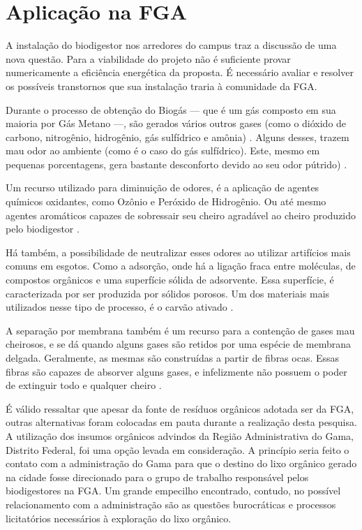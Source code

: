 \section {Aplicação na FGA}
A instalação do biodigestor nos arredores do campus traz a discussão de uma nova questão. Para a viabilidade do projeto não é suficiente provar numericamente a eficiência energética da proposta. É necessário avaliar e resolver os possíveis transtornos que sua instalação traria à comunidade da FGA.
\par Durante o processo de obtenção do Biogás — que é um gás composto em sua maioria por Gás Metano —, são gerados vários outros gases (como o dióxido de carbono, nitrogênio, hidrogênio, gás sulfídrico e amônia) \cite{treinamentobiodigestao}. Alguns desses, trazem mau odor ao ambiente (como é o caso do gás sulfídrico). Este, mesmo em pequenas porcentagens, gera bastante desconforto devido ao seu odor pútrido) \cite{viabilidadefinanceirabiogas}.
\par Um recurso utilizado para diminuição de odores, é a aplicação de agentes químicos oxidantes, como Ozônio e Peróxido de Hidrogênio. Ou até mesmo agentes aromáticos capazes de sobressair seu cheiro agradável ao cheiro produzido pelo biodigestor \cite{reduceammoniaandodor} \cite{viabilidadefinanceirabiogas}.
\par Há também, a possibilidade de neutralizar esses odores ao utilizar artifícios mais comuns em esgotos. Como a adsorção, onde há a ligação fraca entre moléculas, de compostos orgânicos e uma superfície sólida de adsorvente. Essa superfície, é caracterizada por ser produzida por sólidos porosos. Um dos materiais mais utilizados nesse tipo de processo, é o carvão ativado \cite{alternativasemissoes}.
\par A separação por membrana também é um recurso para a contenção de gases mau cheirosos, e se dá quando alguns gases são retidos por uma espécie de membrana delgada. Geralmente, as mesmas são construídas a partir de fibras ocas. Essas fibras são capazes de absorver alguns gases, e infelizmente não possuem o poder de extinguir todo e qualquer cheiro \cite{alternativasemissoes}.
\par É válido ressaltar que apesar da fonte de resíduos orgânicos adotada ser da FGA, outras alternativas foram colocadas em pauta durante a realização desta pesquisa. A utilização dos insumos orgânicos advindos da Região Administrativa do Gama, Distrito Federal, foi uma opção levada em consideração. A princípio seria feito o contato com a administração do Gama para que o destino do lixo orgânico gerado na cidade fosse direcionado para o grupo de trabalho responsável pelos biodigestores na FGA. Um grande empecilho encontrado, contudo, no possível relacionamento com a administração são as questões burocráticas e processos licitatórios necessários à exploração do lixo orgânico.
